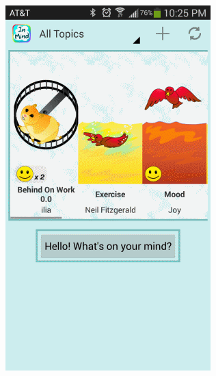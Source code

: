     \begin{figure}
      \caption{\textbf{Main View} --
          (a) The main view has a sliding window of topics.
          Topic icons are prominently displayed,
          as are the topic titles and owners.
          Topics that have updates are highlighted with a yellow glow.
          (b) Since there can be many topics shared within the group,
          the main view has filters that can show a subset of the topics.
          The filter dropdown is circled in red.
          The first 4 filters are defaults,
          the ``+ New Collection" takes the user to the
          collection creation page (shown in the next subfigure),
          and the ``Important" collection shown here is a custom collection.
          (c) Users can make their own collections to sort topics
          the way they want to.
          Boxed in red are all the topics that are available to the user
          at the moment, and can be included in the new collection.}
      \centering
      \begin{subfigure}[b]{0.3\textwidth}
        \includegraphics[width=\textwidth]{home_view.png}

\end{subfigure}
\end{figure}
